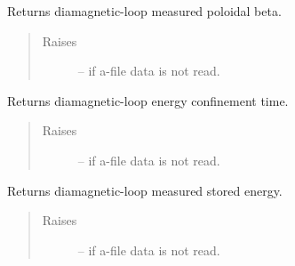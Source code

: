 \documentclass[letterpaper,10pt,english]{sphinxmanual}
\begin{document}
\begin{fulllineitems}
\begin{fulllineitems}
\end{fulllineitems}


\begin{fulllineitems}
\label{eqtools:eqtools.eqdskreader.EqdskReader.getDiamagBetaP}
Returns diamagnetic-loop measured poloidal beta.
\begin{quote}\begin{description}
\item[{Raises }] \leavevmode
{} -- 
if a-file data is not read.

\end{description}\end{quote}

\end{fulllineitems}


\begin{fulllineitems}
\label{eqtools:eqtools.eqdskreader.EqdskReader.getDiamagTauE}
Returns diamagnetic-loop energy confinement time.
\begin{quote}\begin{description}
\item[{Raises }] \leavevmode
{} -- 
if a-file data is not read.

\end{description}\end{quote}

\end{fulllineitems}


\begin{fulllineitems}
\label{eqtools:eqtools.eqdskreader.EqdskReader.getDiamagWp}
Returns diamagnetic-loop measured stored energy.
\begin{quote}\begin{description}
\item[{Raises }] \leavevmode
{} -- 
if a-file data is not read.

\end{description}\end{quote}

\end{fulllineitems}


\end{fulllineitems}
\end{document}
